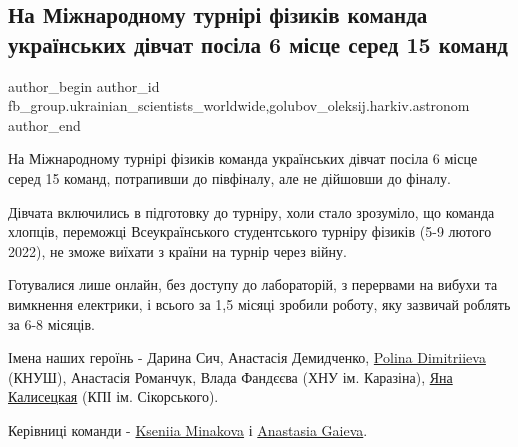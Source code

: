 
 
 
 
 
 
\subsection{На Міжнародному турнірі фізиків команда українських дівчат посіла 6 місце серед 15 команд}
\label{sec:13_05_2022.fb.fb_group.ukrainian_scientists_worldwide.1.turnir_fizykiv_divchata}
 
\ifcmt
 author_begin
   author_id fb_group.ukrainian_scientists_worldwide,golubov_oleksij.harkiv.astronom
 author_end
\fi

На Міжнародному турнірі фізиків команда українських дівчат посіла 6 місце серед
15 команд, потрапивши до півфіналу, але не дійшовши до фіналу.


Дівчата включились в підготовку до турніру, холи стало зрозуміло, що команда
хлопців, переможці Всеукраїнського студентського турніру фізиків (5-9 лютого
2022), не зможе виїхати з країни на турнір через війну. 


Готувалися лише онлайн, без доступу до лабораторій, з перервами на вибухи та
вимкнення електрики, і всього за 1,5 місяці зробили роботу, яку зазвичай
роблять за 6-8 місяців. 

Імена наших героїнь - Дарина Сич, Анастасія Демидченко,
\href{https://www.facebook.com/PolinaDimitriieva}{Polina Dimitriieva} (КНУШ),
Анастасія Романчук, Влада Фандєєва (ХНУ ім. Каразіна),
\href{https://www.facebook.com/profile.php?id=100004338379209}{Яна Калисецкая}
(КПІ ім. Сікорського).

Керівниці команди - \href{https://www.facebook.com/fridayjohnes}{Kseniia
Minakova} і \href{https://www.facebook.com/anastasia.gaieva}{Anastasia Gaieva}.

